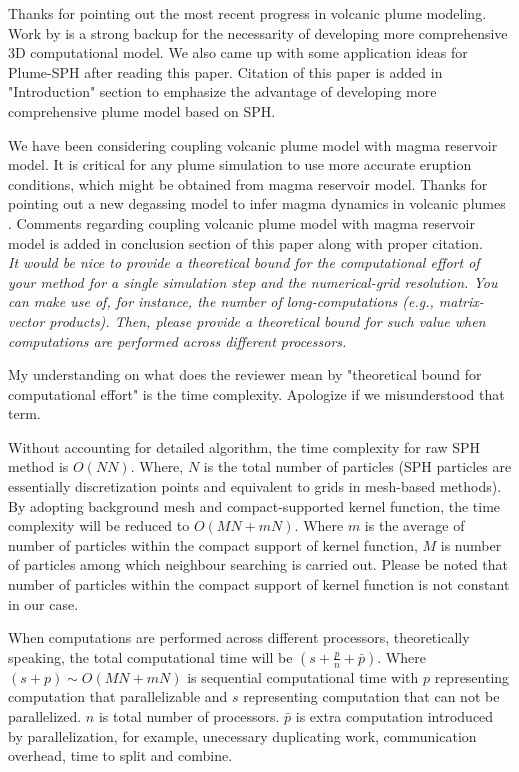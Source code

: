 \documentclass[10pt,a4paper]{article}
\begin{document}
Thanks for pointing out the most recent progress in volcanic plume modeling. 
Work by \citet{costa2018understanding} is a strong backup for the necessarity of developing more comprehensive 3D computational model. We also came up with some application ideas for Plume-SPH after reading this paper. Citation of this paper is added in "Introduction" section to emphasize the advantage of developing more comprehensive plume model based on SPH.

We have been considering coupling volcanic plume model with magma reservoir model. It is critical for any plume simulation to use more accurate eruption conditions, which might be obtained from magma reservoir model. Thanks for pointing out a new degassing model to infer magma dynamics in volcanic plumes \cite{terray2018new}. Comments regarding coupling volcanic plume model with magma reservoir model is added in conclusion section of this paper along with proper citation.
\\[3pt]

\textit{It would be nice to provide a theoretical bound for the computational effort of your method for a single simulation step and the numerical-grid resolution. You can make use of, for instance, the number of long-computations (e.g., matrix- vector products). Then, please provide a theoretical bound for such value when computations are performed across different processors.
}

My understanding on what does the reviewer mean by "theoretical bound for computational effort" is the time complexity. Apologize if we misunderstood that term. 

Without accounting for detailed algorithm, the time complexity for raw SPH method is $O(NN)$. Where, $N$ is the total number of particles (SPH particles are essentially discretization points and equivalent to grids in mesh-based methods). By adopting background mesh and compact-supported kernel function, the time complexity will be reduced to $O(MN+mN)$. Where $m$ is the average of number of particles within the compact support of kernel function, $M$ is number of particles among which neighbour searching is carried out. Please be noted that number of particles within the compact support of kernel function is not constant in our case. 

When computations are performed across different processors, theoretically speaking, the total computational time will be $(s+\frac{p}{n}+\bar{p})$. Where $(s+p)\sim O(MN+mN)$ is sequential computational time with $p$ representing computation that parallelizable and $s$ representing computation that can not be parallelized. $n$ is total number of processors. $\bar{p}$ is extra computation introduced by parallelization, for example, 
unecessary duplicating work, communication overhead, time to split and combine.
\end{document}
